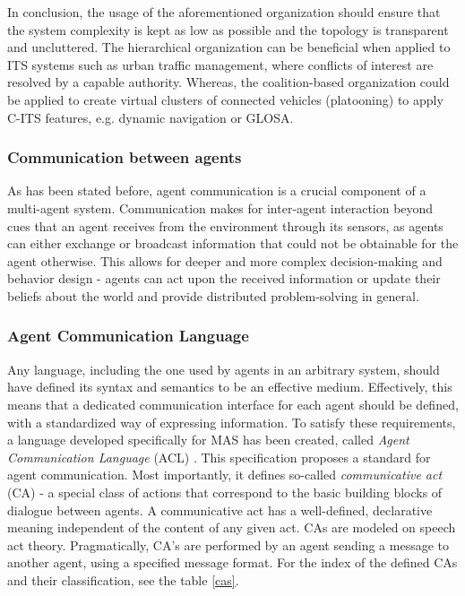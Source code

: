 \documentclass[0main.tex]{subfiles}
\begin{document}
In conclusion, the usage of the aforementioned organization should ensure that the system complexity 
is kept as low as possible and the topology is transparent and uncluttered. The hierarchical 
organization can be beneficial when applied to ITS systems such as urban traffic management, where 
conflicts of interest are resolved by a capable authority. Whereas, the coalition-based 
organization could be applied to create virtual clusters of connected vehicles (platooning) to apply 
C-ITS features, e.g. dynamic navigation or GLOSA.

\subsubsection{Communication between agents}

As has been stated before, agent communication is a crucial component of a multi-agent system. 
Communication makes for inter-agent interaction beyond cues that an agent receives from the environment 
through its sensors, as agents can either exchange or broadcast information that could not be obtainable 
for the agent otherwise. This allows for deeper and more complex decision-making and behavior design - 
agents can act upon the received information or update their beliefs about the world and provide 
distributed problem-solving in general. 

\subsubsection{Agent Communication Language}\label{sec-acl}

Any language, including the one used by agents in an arbitrary system, should have defined its syntax and 
semantics to be an effective medium. Effectively, this means that a dedicated communication
interface for each agent should be defined, with a standardized way of expressing information. 
To satisfy these requirements, a language developed specifically for MAS has been created, 
called \emph{Agent Communication Language} (ACL) \cite{IntelligentPhysicalAgents2001}. 
This specification proposes a standard for agent communication. Most importantly, it defines 
so-called \emph{communicative act} (CA) - a special class of actions that correspond to the basic
building blocks of dialogue between agents. A communicative act has a well-defined, declarative
meaning independent of the content of any given act. CAs are modeled on speech act theory.
Pragmatically, CA's are performed by an agent sending a message to another agent, using a
specified message format. For the index of the defined CAs and their classification, see the
table \ref{cas}.
\end{document}
